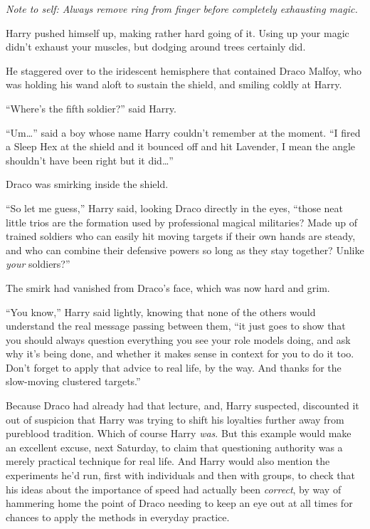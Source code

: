 \emph{Note to self: Always remove ring from finger before completely exhausting magic.}

Harry pushed himself up, making rather hard going of it. Using up your magic didn’t exhaust your muscles, but dodging around trees certainly did.

He staggered over to the iridescent hemisphere that contained Draco Malfoy, who was holding his wand aloft to sustain the shield, and smiling coldly at Harry.

“Where’s the fifth soldier?” said Harry.

“Um…” said a boy whose name Harry couldn’t remember at the moment. “I fired a Sleep Hex at the shield and it bounced off and hit Lavender, I mean the angle shouldn’t have been right but it did…”

Draco was smirking inside the shield.

“So let me guess,” Harry said, looking Draco directly in the eyes, “those neat little trios are the formation used by professional magical militaries? Made up of trained soldiers who can easily hit moving targets if their own hands are steady, and who can combine their defensive powers so long as they stay together? Unlike \emph{your} soldiers?”

The smirk had vanished from Draco’s face, which was now hard and grim.

“You know,” Harry said lightly, knowing that none of the others would understand the real message passing between them, “it just goes to show that you should always question everything you see your role models doing, and ask why it’s being done, and whether it makes sense in context for you to do it too. Don’t forget to apply that advice to real life, by the way. And thanks for the slow-moving clustered targets.”

Because Draco had already had that lecture, and, Harry suspected, discounted it out of suspicion that Harry was trying to shift his loyalties further away from pureblood tradition. Which of course Harry \emph{was}. But this example would make an excellent excuse, next Saturday, to claim that questioning authority was a merely practical technique for real life. And Harry would also mention the experiments he’d run, first with individuals and then with groups, to check that his ideas about the importance of speed had actually been \emph{correct}, by way of hammering home the point of Draco needing to keep an eye out at all times for chances to apply the methods in everyday practice.

